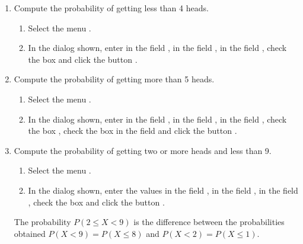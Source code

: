 \begin{enumerate}[leftmargin=*]
\begin{enumerate}
\item Compute the probability of getting less than 4 heads.
\begin{indication}
\begin{enumerate}
\item Select the menu .
\item In the dialog shown, enter  in the field ,  in the field
,  in the field , check the box  and click the button .
\end{enumerate}
\end{indication}

\item Compute the probability of getting more than 5 heads.
\begin{indication}
\begin{enumerate}
\item Select the menu .
\item In the dialog shown, enter  in the field ,  in the field
,  in the field , check the box , check the box  in the field  and click the button .
\end{enumerate}
\end{indication}

\item Compute the probability of getting two or more heads and less than 9.
\begin{indication}
\begin{enumerate}
\item Select the menu .
\item In the dialog shown, enter the values  in the field ,  in the field ,  in the field , check the box  and click the button .
\end{enumerate}
The probability $P(2\leq X<9)$ is the difference between the probabilities obtained $P(X<9)=P(X\leq 8)$ and $P(X<2)=P(X\leq 1)$.
\end{indication}
\end{enumerate}



\end{enumerate}
